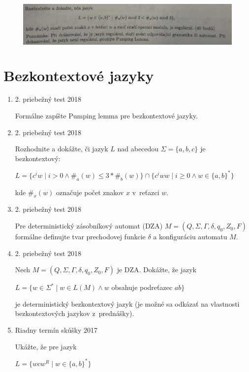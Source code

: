 \documentclass[]{article}
\begin{document}
	\begin{figure}[H]
		\includegraphics[width=\textwidth]{tasks/regularne/task9.png}
	\end{figure}

	\section{Bezkontextové jazyky}
	
	\begin{enumerate}
		\item 2. priebežný test 2018
		
		Formálne zapíšte Pumping lemma pre bezkontextové jazyky.
		
		\item 2. priebežný test 2018
		
		Rozhodnite a dokážte, či jazyk $L$ nad abecedou $\Sigma = \{a,b,c\}$ je bezkontextový:
		
		$L = \{c^iw \mid i > 0 \land \#_a(w) \leq 3 * \#_b(w)\} \cap \{c^iww \mid i \geq 0 \land w \in \{a,b\}^*\}$
		
		kde $\#_x(w)$ označuje počet znakov $x$ v~reťazci $w$.
		
		\item 2. priebežný test 2018
		
		Pre deterministický zásobníkový automat (DZA) $M = (Q, \Sigma, \Gamma, \delta, q_0, Z_0, F)$ formálne definujte tvar prechodovej funkcie $\delta$ a konfiguráciu automatu $M$.
		
		\item 2. priebežný test 2018
		
		Nech $M = (Q, \Sigma, \Gamma, \delta, q_0, Z_0, F)$ je DZA. Dokážte, že jazyk
		
		$L = \{w \in \Sigma^* \mid w \in L(M) \land w$ obsahuje podreťazec $ab\}$
		
		je deterministický bezkontextový jazyk (je možné sa odkázať na vlastnosti bezkontextových jazykov z~prednášky).
		
		\item Riadny termín skúšky 2017
		
		Ukážte, že pre jazyk
		
		$L = \{wcw^R \mid w \in \{a,b\}^*\}$
		

\end{enumerate}
\end{document}
